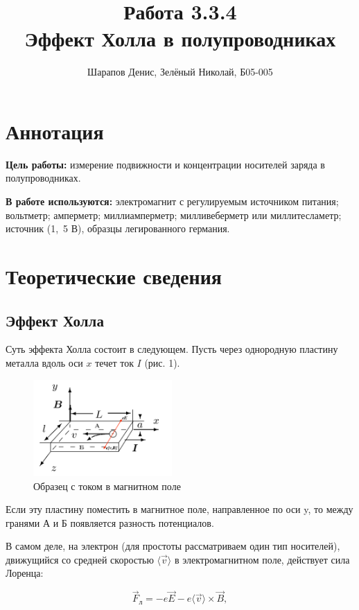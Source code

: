 \documentclass[a4paper]{article}
\title{Работа 3.3.4 \\ Эффект Холла в полупроводниках}
\author{Шарапов Денис, Зелёный Николай, Б05-005}
\date{}
\theoremstyle{definition}
\theoremstyle{remark}
\begin{document}
    \maketitle
    \tableofcontents
    \newpage
    
\section{Аннотация}

\textbf{Цель работы:} измерение подвижности и концентрации носителей заряда в полупроводниках. 
 
\noindent \textbf{В работе используются:} электромагнит с регулируемым источником питания; вольтметр; амперметр; миллиамперметр; милливеберметр или миллитесламетр; источник (1,~5 В), образцы легированного германия.

\section{Теоретические сведения}

\subsection{Эффект Холла}

Суть эффекта Холла состоит в следующем. Пусть через однородную пластину металла вдоль оси $x$ течет ток $I$ (рис. 1).

\begin{figure}[h!]
    \centering
    \includegraphics[width = 150pt]{image/Holl1.png}
    \caption{Образец с током в магнитном поле}
\end{figure}

	
	Если эту пластину поместить в магнитное поле, направленное по оси y, то между гранями А и Б появляется разность потенциалов. 
	
	В самом деле, на электрон (для простоты рассматриваем один тип носителей), движущийся со средней скоростью $\langle \vec{v} \rangle$ в электромагнитном поле, действует сила Лоренца:
	
	$$\vec{F}_{\text{л}} = -e\vec{E}-e \langle \vec{v} \rangle \times \vec{B},$$
	
\end{document}
